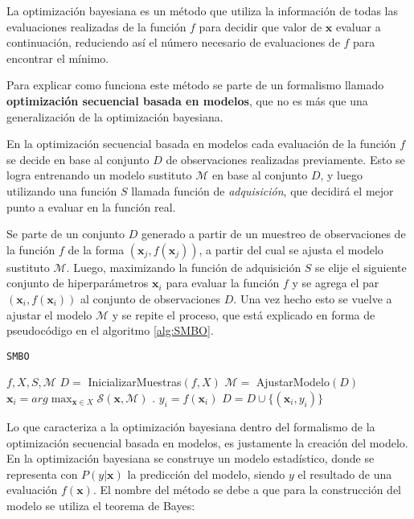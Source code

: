 La optimización bayesiana es un método que utiliza la información de todas las evaluaciones realizadas de la función $f$ para decidir que valor de $\textbf{x}$ evaluar a continuación, reduciendo así el número necesario de evaluaciones de $f$ para encontrar el mínimo.

Para explicar como funciona este método se parte de un formalismo llamado \textbf{optimización secuencial basada en modelos}, que no es más que una generalización de la optimización bayesiana.


En la optimización secuencial basada en modelos cada evaluación de la función $f$ se decide en base al conjunto $D$ de observaciones realizadas previamente. Esto se logra entrenando un modelo sustituto $\mathcal{M}$ en base al conjunto $D$, y luego utilizando una función $S$ llamada función de \textit{adquisición}, que decidirá el mejor punto a evaluar en la función real.

Se parte de un conjunto $D$ generado a partir de un muestreo de observaciones de la función $f$ de la forma $(\textbf{x}_j, f(\textbf{x}_j))$, a partir del cual se ajusta el modelo sustituto $\mathcal{M}$. Luego, maximizando la función de adquisición $S$ se elije el siguiente conjunto de hiperparámetros $\textbf{x}_i$ para evaluar la función $f$ y se agrega el par $(\textbf{x}_i, f(\textbf{x}_i))$ al conjunto de observaciones $D$. Una vez hecho esto se vuelve a ajustar el modelo $\mathcal{M}$ y se repite el proceso, que está explicado en forma de pseudocódigo en el algoritmo \ref{alg:SMBO}.


\begin{algorithm}
\caption{\texttt{SMBO}}
\label{alg:SMBO}
\begin{algorithmic}[1]
\Require $f, X, S,\mathcal{M}$
\State $D =$ InicializarMuestras$(f, X)$
\vspace{1mm}
	\State $\mathcal{M} =$ AjustarModelo$(D)$
	\State $\textbf{x}_{i} = arg \max_{\textbf{x}\in X} \mathcal{S}(\textbf{x}, \mathcal{M})$ .
	\State $y_i = f(\textbf{x}_i)$	
	\State $D = D \cup \{(\textbf{x}_i, y_i)\}$
\EndFor
\vspace{3mm}

\end{algorithmic}
\end{algorithm}


Lo que caracteriza a la optimización bayesiana dentro del formalismo de la optimización secuencial basada en modelos, es justamente la creación del modelo.
En la optimización bayesiana se construye un modelo estadístico, donde se representa con  $P(y|\textbf{x})$ la predicción del modelo, siendo $y$ el resultado de una evaluación $f(\textbf{x})$. El nombre del método se debe a que para la construcción del modelo se utiliza el teorema de Bayes:
  
